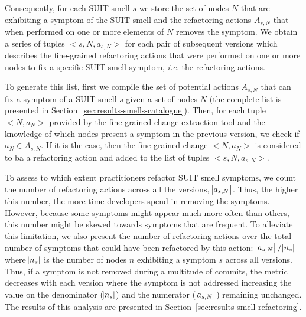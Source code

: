 Consequently, for each SUIT smell $s$ we store the set of nodes $N$ that are exhibiting a symptom of the SUIT smell and the refactoring actions $A_{s,N}$ that when performed on one or more elements of $N$ removes the symptom. We obtain a series of tuples $<s, N, a_{s,N}>$ for each pair of subsequent versions which describes the fine-grained refactoring actions that were performed on one or more nodes to fix a specific SUIT smell symptom, \emph{i.e.} the refactoring actions. 

To generate this list, first we compile the set of potential actions $A_{s,N}$ that can fix a symptom of a SUIT smell $s$ given a set of nodes $N$ (the complete list is presented in Section~\ref{sec:results-smells-catalogue}). Then, for each tuple $<N, a_{N}>$ provided by the fine-grained change extraction tool and the knowledge of which nodes present a symptom in the previous version, we check if $a_{N} \in A_{s,N}$. If it is the case, then the fine-grained change $<N, a_{N}>$ is considered to ba a refactoring action and added to the list of tuples $<s, N, a_{s,N}>$.


To assess to which extent practitioners refactor SUIT smell symptoms, we count the number of refactoring actions across all the versions, $\abs{a_{s,N}}$. Thus, the higher this number, the more time developers spend in removing the symptoms. However, because some symptoms might appear much more often than others, this number might be skewed towards symptoms that are frequent. To alleviate this limitation, we also present the number of refactoring actions over the total number of symptoms that could have been refactored by this action: $\abs{a_{s,N}} / \abs{n_{s}}$ where $\abs{n_{s}}$ is the number of nodes $n$ exhibiting a symptom $s$ across all versions. Thus, if a symptom is not removed during a multitude of commits, the metric decreases with each version where the symptom is not addressed increasing the value on the denominator ($\abs{n_{s}}$) and the numerator ($\abs{a_{s,N}}$) remaining unchanged. The results of this analysis are presented in Section~\ref{sec:results-smell-refactoring}.

